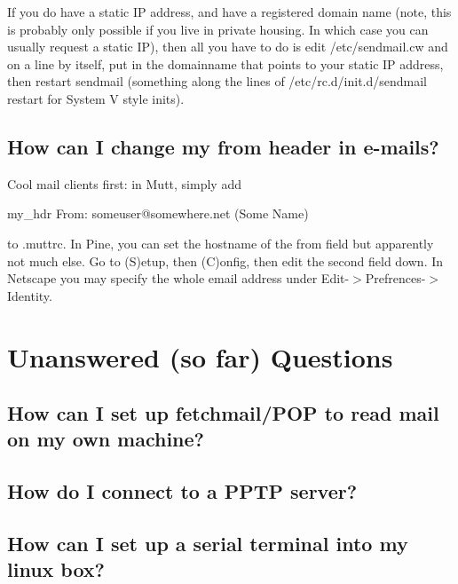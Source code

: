 \documentclass[a4paper]{article}
\begin{document}
If you do have a static IP address, and have a registered domain name (note,
this is probably only possible if you live in private housing. In which case
you can usually request a static IP), then all you have to do is edit
/etc/sendmail.cw and on a line by itself, put in the domainname that points to
your static IP address, then restart sendmail (something along the lines of
/etc/rc.d/init.d/sendmail restart for System V style inits). 






\subsection{How can I change my from header in e-mails?}

Cool mail clients first: in Mutt, simply add 

my\_hdr From: someuser@somewhere.net (Some Name)

to .muttrc. In Pine, you can set the hostname of the from field but apparently
not much else. Go to (S)etup, then (C)onfig, then edit the second field down. 
In Netscape you may specify the whole email address under
Edit-{$>$}Prefrences-{$>$}Identity.




\section{Unanswered (so far) Questions}


\subsection{How can I set up fetchmail/POP to read mail on my own machine?}






\subsection{How do I connect to a PPTP server?}






\subsection{How can I set up a serial terminal into my linux box?}
\end{document}
